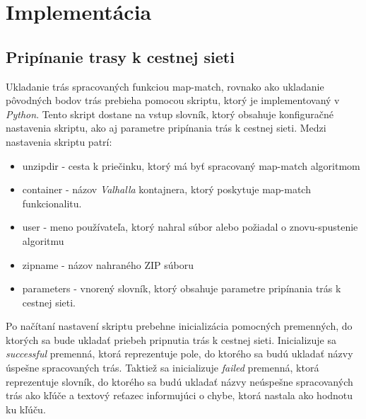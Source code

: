 \section{Implementácia}
\subsection{Pripínanie trasy k cestnej sieti}

\indent \indent Ukladanie trás spracovaných funkciou map-match, rovnako ako ukladanie pôvodných bodov trás prebieha pomocou skriptu, ktorý je implementovaný v \textit{Python}. Tento skript dostane na vstup slovník, ktorý obsahuje konfiguračné nastavenia skriptu, ako aj parametre pripínania trás k cestnej sieti. Medzi nastavenia skriptu patrí:
\begin{itemize}
  \item unzipdir - cesta k priečinku, ktorý má byť spracovaný map-match algoritmom
  \item container - názov \textit{Valhalla} kontajnera, ktorý poskytuje map-match funkcionalitu.
  \item user - meno používateľa, ktorý nahral súbor alebo požiadal o znovu-spustenie algoritmu
  \item zipname - názov nahraného ZIP súboru
  \item parameters - vnorený slovník, ktorý obsahuje parametre pripínania trás k cestnej sieti.
\end{itemize}

Po načítaní nastavení skriptu prebehne inicializácia pomocných premenných, do ktorých sa bude ukladať priebeh pripnutia trás k cestnej sieti. Inicializuje sa \textit{successful} premenná, ktorá reprezentuje pole, do ktorého sa budú ukladať názvy úspešne spracovaných trás. Taktiež sa inicializuje \textit{failed} premenná, ktorá reprezentuje slovník, do ktorého sa budú ukladať názvy neúspešne spracovaných trás ako kľúče a textový reťazec informujúci o chybe, ktorá nastala ako hodnotu ku kľúču.

